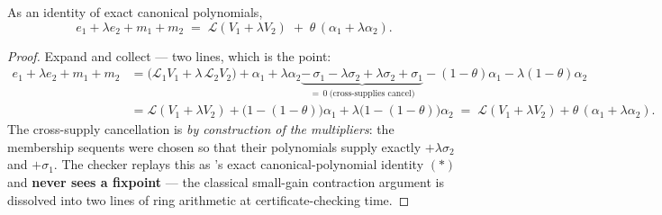 \begin{bprop}\label{prop:sg-identity}
As an identity of exact canonical polynomials,
\[
e_1 + \lambda e_2 + m_1 + m_2
\;=\;
\mathcal{L}(V_1 + \lambda V_2) \;+\; \theta\,(\alpha_1 + \lambda\alpha_2).
\]
\end{bprop}
\begin{proof}
Expand and collect --- two lines, which is the point:
\begin{align*}
e_1 + \lambda e_2 + m_1 + m_2
&= \bigl(\mathcal{L}_1 V_1 + \lambda\,\mathcal{L}_2 V_2\bigr)
 + \alpha_1 + \lambda\alpha_2
 \underbrace{-\,\sigma_1 - \lambda\sigma_2
 + \lambda\sigma_2 + \sigma_1}_{=\,0\ \text{(cross-supplies cancel)}}
 - (1{-}\theta)\alpha_1 - \lambda(1{-}\theta)\alpha_2\\
&= \mathcal{L}(V_1 + \lambda V_2)
 + \bigl(1 - (1{-}\theta)\bigr)\alpha_1
 + \lambda\bigl(1 - (1{-}\theta)\bigr)\alpha_2
\;=\; \mathcal{L}(V_1 + \lambda V_2) + \theta\,(\alpha_1 + \lambda\alpha_2).
\end{align*}
The cross-supply cancellation is \emph{by construction of the
multipliers}: the membership sequents were chosen so that their
polynomials supply exactly $+\lambda\sigma_2$ and $+\sigma_1$. The checker
replays this as 's exact canonical-polynomial identity
$(\ast)$ and \textbf{never sees a fixpoint} --- the classical small-gain
contraction argument is dissolved into two lines of ring arithmetic at
certificate-checking time.
\end{proof}

